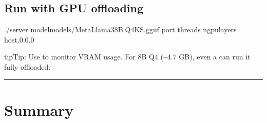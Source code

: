 \documentclass[letterpaper,10pt,english]{sphinxmanual}
\begin{document}
\subsection{Run with GPU offloading}
\label{\detokenize{llama-cpp:run-with-gpu-offloading}}\label{\detokenize{llama-cpp:llama-cpp-run-with-gpu-offloading}}
\begin{sphinxVerbatim}[commandchars=\\\{\}]
./server
\PYGZhy{}\PYGZhy{}modelmodels/Meta\PYGZhy{}Llama\PYGZhy{}3\PYGZhy{}8B.Q4\PYGZus{}K\PYGZus{}S.gguf
\PYGZhy{}\PYGZhy{}port
\PYGZhy{}\PYGZhy{}threads
\PYGZhy{}\PYGZhy{}n\PYGZhy{}gpu\PYGZhy{}layers
\PYGZhy{}\PYGZhy{}host.0.0.0
\end{sphinxVerbatim}

\begin{sphinxadmonition}{tip}{Tip:}
\sphinxAtStartPar
Use  to monitor VRAM usage.
For 8B Q4 (\textasciitilde{}4.7 GB), even a  can run it fully offloaded.
\end{sphinxadmonition}


\bigskip\hrule\bigskip



\section{Summary}
\label{\detokenize{llama-cpp:summary}}\label{\detokenize{llama-cpp:llama-cpp-summary}}
\end{document}
